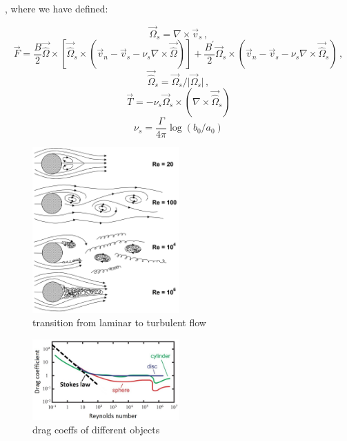 , where we have defined:

\begin{equation}
\vec{\Omega}_s = \nabla \times \vec{v}_s\,,
\end{equation}
\begin{equation}
\vec{F} = \frac{B}{2} \vec{\hat{\Omega}} \times [\vec{\hat{\Omega}}_s \times (\vec{v}_n - \vec{v}_s - \nu_s\nabla \times \vec{\hat{\Omega}})]
+ \frac{B^{\prime}}{2} \vec{\Omega}_s \times (\vec{v}_n - \vec{v}_s - \nu_s\nabla \times \vec{\hat{\Omega}}_s)\,,
\end{equation}
\begin{equation}
\vec{\hat{\Omega}}_s = \vec{\Omega}_s / \vert \vec{\Omega}_s \vert\,,
\end{equation}
\begin{equation}
\vec{T} = -\nu_s \vec{\Omega}_s \times (\nabla \times \vec{\hat{\Omega}}_s)
\end{equation}
\begin{equation}
\nu_s = \frac{\Gamma}{4\pi} \log(b_0 / a_0)
\end{equation}

\begin{figure}[h]
	\centering
	\includegraphics[width=0.5\textwidth]{graphics/theory/laminar-turbulent}
	\caption{transition from laminar to turbulent flow}
	\label{laminar-turbulent}
\end{figure}

\begin{figure}[h]
	\centering
	\includegraphics[width=0.5\textwidth]{graphics/theory/C-Re}
	\caption{drag coeffs of different objects}
	\label{C-Re}
\end{figure}

